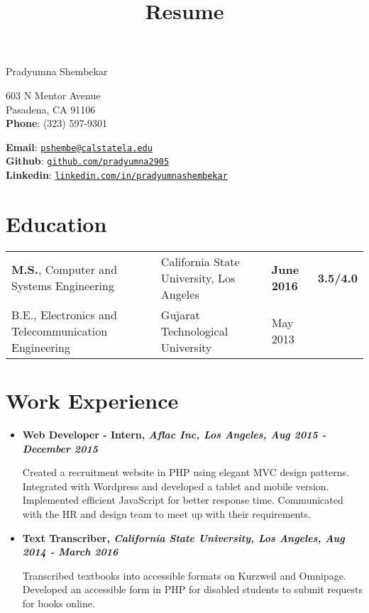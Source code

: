 \documentclass[10pt]{article}%
\title{Resume}
\def\name{Pradyumna Shembekar}
\begin{document}
{\huge \name}


\bigskip

\begin{minipage}[t]{0.495\textwidth}

  603 N Mentor Avenue\\
  Pasadena, CA 91106\\ \textbf{Phone}: (323) 597-9301
\end{minipage}
\begin{minipage}[t]{0.495\textwidth}
  \textbf{Email}: \href{mailto:pshembe@calstatela.edu}{\tt{pshembe@calstatela.edu}} \\ \textbf{Github}: \href{https://github.com/pradyumna2905}{\tt{github.com/pradyumna2905}} \\ \textbf{Linkedin}: \href{https://www.linkedin.com/in/pradyumnashembekar}{\tt{linkedin.com/in/pradyumnashembekar}}
\end{minipage}

\section*{Education}

\begin{tabular}{llll}
  \textbf{M.S.}, Computer and Systems Engineering & California State University, Los Angeles & \textbf{June 2016} & \textbf{3.5/4.0} \\
  B.E., Electronics and Telecommunication Engineering & Gujarat Technological University & May 2013 \\
\end{tabular}

\section*{Work Experience}

\begin{itemize} \setlength{\parskip}{0.5pt} 
    
    \item \textbf{Web Developer - Intern, \textit{Aflac Inc, Los Angeles, Aug 2015 - December 2015}}
    
		Created a recruitment website in PHP using elegant MVC design patterns. Integrated with Wordpress and developed a tablet and mobile version. Implemented efficient JavaScript for better response time. Communicated with the HR and design team to meet up with their requirements.
    
    \item \textbf{Text Transcriber, \textit{California State University, Los Angeles, Aug 2014 - March 2016}}
        
        Transcribed textbooks into accessible formats on Kurzweil and Omnipage. Developed an accessible form in PHP for disabled students to submit requests for books online.
        
\end{itemize}
\end{document}
